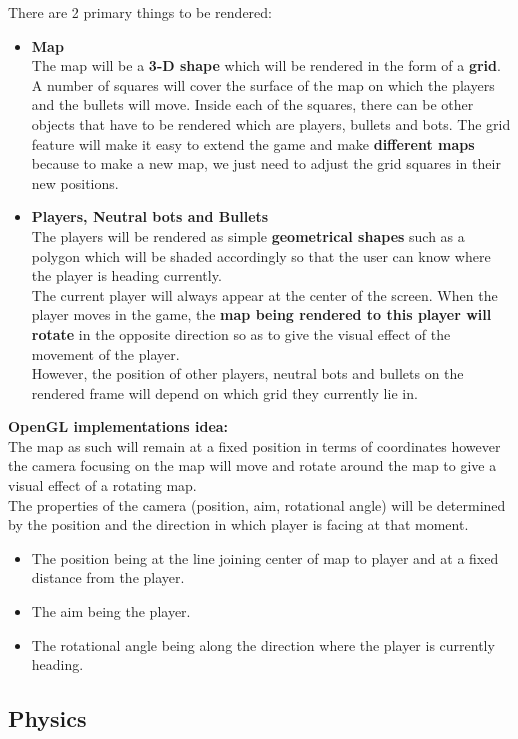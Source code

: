 \documentclass[ebook,12pt,oneside,openany]{article}
\begin{document}
There are 2 primary things to be rendered:
\begin{itemize}
\item \textbf{Map} \\
The map will be a \textbf{3-D shape} which will be rendered in the form of a  \textbf{grid}. A number of squares will cover the surface of the map on which the players and the bullets will move. Inside each of the squares, there can be other objects that have to be rendered which are players, bullets and bots. The grid feature will make it easy to extend the game and make \textbf{different maps} because to make a new map, we just need to adjust the grid squares in their new positions.
\item \textbf{Players, Neutral bots and Bullets} \\
The players will be rendered as simple \textbf{geometrical shapes} such as a polygon which will be shaded accordingly so that the user can know where the player is heading currently.\\
The current player will always appear at the center of the screen. When the player moves in the game, the \textbf{map being rendered to this player will rotate} in the opposite direction so as to give the visual effect of the movement of the player.\\
However, the position of other players, neutral bots and bullets on the rendered frame will depend on which grid they currently lie in.\\
\end{itemize}
\textbf{OpenGL implementations idea:}\\
The map as such will remain at a fixed position in terms of coordinates however the camera focusing on the map will move and rotate around the map to give a visual effect of a rotating map.\\
The properties of the camera (position, aim, rotational angle) will be determined by the position and the direction in which player is facing at that moment. 
\begin{itemize}
\item The position being at the line joining center of map to player and at a fixed distance from the player.
\item The aim being the player.
\item The rotational angle being along the direction where the player is currently heading.
\end{itemize}
\subsection{Physics}
\end{document}
